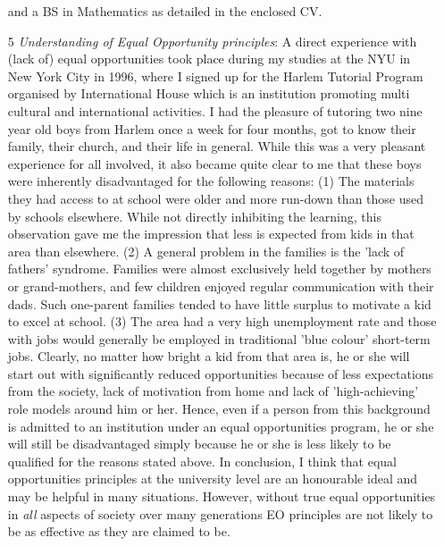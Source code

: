 \documentclass[12pt,a4paper]{article}
\begin{document}
\begin{itemize}
  and a BS in Mathematics as detailed in the enclosed CV.
  \item[5] \textit{Understanding of Equal Opportunity principles}:
  A direct experience with (lack of) equal 
  opportunities took place during my studies at the NYU in New York City 
  in 1996, where I signed up for the Harlem Tutorial Program organised by 
  International House which is an institution promoting multi cultural 
  and international activities.
  I had the pleasure of tutoring two nine year old boys from Harlem once 
  a week for four months, got to know their family, their church, and their
  life in general.
  While this was a very pleasant experience for all involved, it also 
  became quite clear to me that these boys were inherently 
  disadvantaged for the following reasons: 
  (1) The materials they had access to at school were older and more 
  run-down than those used by schools elsewhere. 
  While not directly inhibiting the learning, this observation gave me
  the impression that less is expected from kids in that area than elsewhere.
  (2) A general problem in the families is the 'lack of fathers' syndrome. 
  Families were almost exclusively held together by mothers or grand-mothers, 
  and few children enjoyed regular communication with their dads.
  Such one-parent families tended to have little surplus to motivate a kid
  to excel at school. 
  (3) The area had a very high unemployment rate and those with jobs would 
  generally be employed in traditional 'blue colour' short-term jobs.
  Clearly, no matter how bright a kid from that area is, he or she 
  will start out with significantly reduced opportunities because
  of less expectations from the society, 
  lack of motivation from home and lack of 'high-achieving'
  role models around him or her.
  Hence, even if a person from this background is admitted to an institution
  under an equal opportunities program, he or she will still be 
  disadvantaged simply because he or she is less likely to be qualified
  for the reasons stated above.
  In conclusion, I think that equal opportunities principles at the 
  university level are an honourable ideal and may be helpful in 
  many situations. However, without true equal opportunities in \emph{all} 
  aspects of society over many generations EO principles are not likely to be 
  as effective as they are claimed to be. 
\end{itemize}
\end{document}
